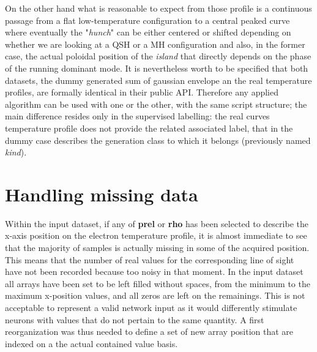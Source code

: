 On the other hand what is reasonable to expect from those profile is a continuous passage from a flat low-temperature configuration to a central peaked curve where eventually the "\textit{hunch}" can be either centered or shifted depending on whether we are looking at a QSH or a MH configuration and also, in the former case, the actual poloidal position of the \textit{island} that directly depends on the phase of the running dominant mode.
It is nevertheless worth to be specified that both datasets, the dummy generated sum of gaussian envelope an the real temperature profiles, are formally identical in their public API. Therefore  any applied algorithm can be used with one or the other, with the same script structure; the main difference resides only in the supervised labelling: the real curves temperature profile does not provide the related associated label, that in the dummy case describes the generation class to which it belongs (previously named \textit{kind}).





\section{Handling missing data}

Within the input dataset, if any of \textbf{prel} or \textbf{rho} has been selected to describe the x-axis position on the electron temperature profile, it is almost immediate to see that the majority of samples is actually missing in some of the acquired position. This means that the number of real values for the corresponding line of sight have not been recorded because too noisy in that moment.
In the input dataset all arrays have been set to be left filled without spaces, from the minimum to the maximum x-position values, and all zeros are left on the remainings. This is not acceptable to represent a valid network input as it would differently stimulate neurons with values that do not pertain to the same quantity.
A first reorganization was thus needed to define a set of new array position that are indexed on a the actual contained value basis.

